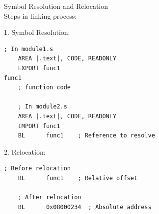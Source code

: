 \begin{KR}{Symbol Resolution and Relocation}\\
Steps in linking process:

1. Symbol Resolution:
\begin{lstlisting}[language=armasm, style=basesmol]
    ; In module1.s
    AREA |.text|, CODE, READONLY
    EXPORT func1
func1
    ; function code
    
    ; In module2.s
    AREA |.text|, CODE, READONLY
    IMPORT func1
    BL      func1    ; Reference to resolve
\end{lstlisting}

2. Relocation:
\begin{lstlisting}[language=armasm, style=basesmol]
    ; Before relocation
    BL      func1    ; Relative offset
    
    ; After relocation
    BL      0x08000234  ; Absolute address
\end{lstlisting}
\end{KR}

